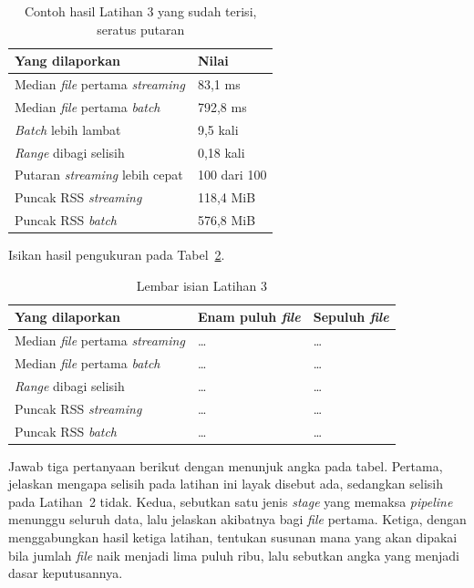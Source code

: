 \begin{table}[htbp]
  \centering
  \caption{Contoh hasil Latihan 3 yang sudah terisi, seratus putaran}
  \label{tab:lat3pipa-contoh}
  \begin{tabularx}{\textwidth}{|X|l|}
    \hline
    \textbf{Yang dilaporkan} & \textbf{Nilai} \\
    \hline
    Median \textit{file} pertama \textit{streaming} & 83,1 ms \\
    \hline
    Median \textit{file} pertama \textit{batch} & 792,8 ms \\
    \hline
    \textit{Batch} lebih lambat & 9,5 kali \\
    \hline
    \textit{Range} dibagi selisih & 0,18 kali \\
    \hline
    Putaran \textit{streaming} lebih cepat & 100 dari 100 \\
    \hline
    Puncak RSS \textit{streaming} & 118,4 MiB \\
    \hline
    Puncak RSS \textit{batch} & 576,8 MiB \\
    \hline
  \end{tabularx}
\end{table}

Isikan hasil pengukuran pada Tabel~\ref{tab:lat3pipa-hasil}.

\begin{table}[htbp]
  \centering
  \caption{Lembar isian Latihan 3}
  \label{tab:lat3pipa-hasil}
  \begin{tabularx}{\textwidth}{|X|l|l|}
    \hline
    \textbf{Yang dilaporkan} & \textbf{Enam puluh \textit{file}} & \textbf{Sepuluh \textit{file}} \\
    \hline
    Median \textit{file} pertama \textit{streaming} & \dots & \dots \\
    \hline
    Median \textit{file} pertama \textit{batch} & \dots & \dots \\
    \hline
    \textit{Range} dibagi selisih & \dots & \dots \\
    \hline
    Puncak RSS \textit{streaming} & \dots & \dots \\
    \hline
    Puncak RSS \textit{batch} & \dots & \dots \\
    \hline
  \end{tabularx}
\end{table}

Jawab tiga pertanyaan berikut dengan menunjuk angka pada tabel. Pertama,
jelaskan mengapa selisih pada latihan ini layak disebut ada, sedangkan selisih
pada Latihan~2 tidak. Kedua, sebutkan satu jenis \textit{stage} yang memaksa
\textit{pipeline} menunggu seluruh data, lalu jelaskan akibatnya bagi
\textit{file} pertama. Ketiga, dengan menggabungkan hasil ketiga latihan,
tentukan susunan mana yang akan dipakai bila jumlah \textit{file} naik menjadi
lima puluh ribu, lalu sebutkan angka yang menjadi dasar keputusannya.

